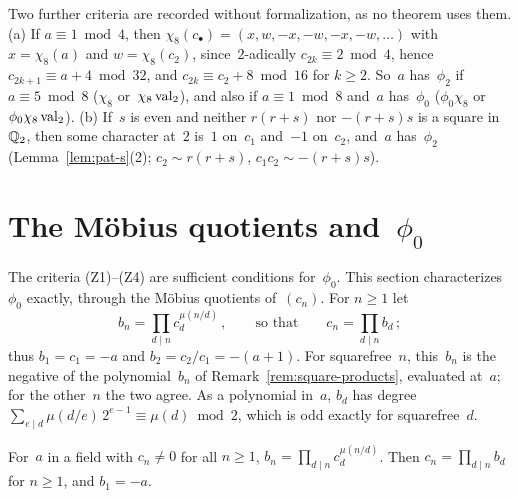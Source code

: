 \begin{remark}
  \label{rem:phi2}
  Two further criteria are recorded without formalization, as no theorem uses them.
  (a) If $a \equiv 1 \bmod 4$, then $\chi_8(c_\bullet) = (x, w, -x, -w, -x, -w, \dots)$ with
  $x = \chi_8(a)$ and $w = \chi_8(c_2)$, since~$2$-adically $c_{2k} \equiv 2 \bmod 4$, hence
  $c_{2k+1} \equiv a + 4 \bmod 32$, and $c_{2k} \equiv c_2 + 8 \bmod 16$ for $k \ge 2$. So~$a$
  has~$\phi_2$ if $a \equiv 5 \bmod 8$ ($\chi_8$ or~$\chi_8 \operatorname{val}_2$), and also if $a \equiv 1 \bmod
  8$ and~$a$ has~$\phi_0$ ($\phi_0 \chi_8$ or $\phi_0 \chi_8 \operatorname{val}_2$).
  (b) If~$s$ is even and neither $r(r + s)$ nor $-(r + s)s$ is a square in~$\mathbb{Q}_2$, then some
  character at~$2$ is~$1$ on~$c_1$ and~$-1$ on~$c_2$, and~$a$ has~$\phi_2$
  (Lemma~\ref{lem:pat-s}(2); $c_2 \sim r(r+s)$, $c_1 c_2 \sim -(r+s)s$).
\end{remark}


\section{The Möbius quotients and~\texorpdfstring{$\phi_0$}{phi\_0}}
\label{sec:moebius}

The criteria (Z1)--(Z4) are sufficient conditions for~$\phi_0$. This section characterizes~$\phi_0$
exactly, through the Möbius quotients of~$(c_n)$. For $n \ge 1$ let
\[ b_n = \prod_{d \mid n} c_d^{\mu(n/d)}\,, \qquad\text{so that}\qquad c_n = \prod_{d \mid n} b_d\,; \]
thus $b_1 = c_1 = -a$ and $b_2 = c_2/c_1 = -(a + 1)$. For squarefree~$n$, this~$b_n$ is the
negative of the polynomial~$b_n$ of Remark~\ref{rem:square-products}, evaluated at~$a$; for the
other~$n$ the two agree. As a polynomial in~$a$, $b_d$ has degree
$\sum_{e \mid d} \mu(d/e)\, 2^{e-1} \equiv \mu(d) \bmod 2$, which is odd exactly for
squarefree~$d$.

\begin{definition}
  \label{def:bseq}
  \leanok
  For~$a$ in a field with $c_n \ne 0$ for all $n \ge 1$, $b_n = \prod_{d \mid n} c_d^{\mu(n/d)}$.
  Then $c_n = \prod_{d \mid n} b_d$ for $n \ge 1$, and $b_1 = -a$.
\end{definition}

